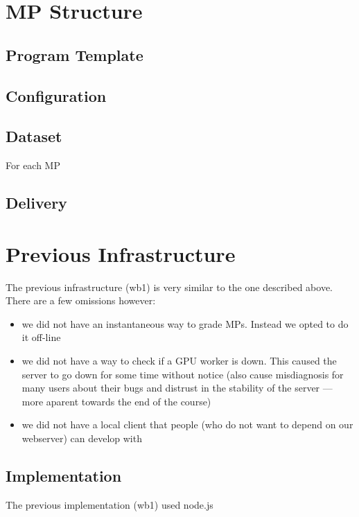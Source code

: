 \section{MP Structure}

\subsection{Program Template}

\subsection{Configuration}

\subsection{Dataset}

For each MP

\subsection{Delivery}

\section{Previous Infrastructure}

The previous infrastructure (wb1) is very similar to the one described
above. There are a few omissions however:

\begin{itemize}
\item
  we did not have an instantaneous way to grade MPs. Instead we opted to
  do it off-line
\item
  we did not have a way to check if a GPU worker is down. This caused
  the server to go down for some time without notice (also cause
  misdiagnosis for many users about their bugs and distrust in the
  stability of the server --- more aparent towards the end of the
  course)
\item
  we did not have a local client that people (who do not want to depend
  on our webserver) can develop with
\end{itemize}

\subsection{Implementation}

The previous implementation (wb1) used node.js

